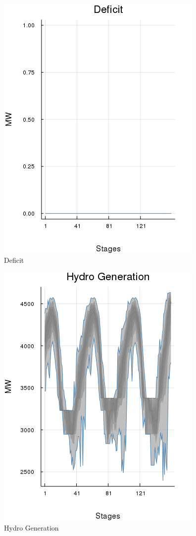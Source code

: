 \documentclass{juliacon}
\begin{document}
\begin{figure}[H]
\centerline{\includegraphics[width=0.55\linewidth]{fig/plot_agg_result_def.png}}
\caption{Deficit}
\label{fig:plot_agg_result_def}
\end{figure}

\begin{figure}[H]
\centerline{\includegraphics[width=0.55\linewidth]{fig/plot_agg_result_hydrogen.png}}
\caption{Hydro Generation}
\label{fig:plot_agg_result_hydrogen}
\end{figure}
\end{document}
